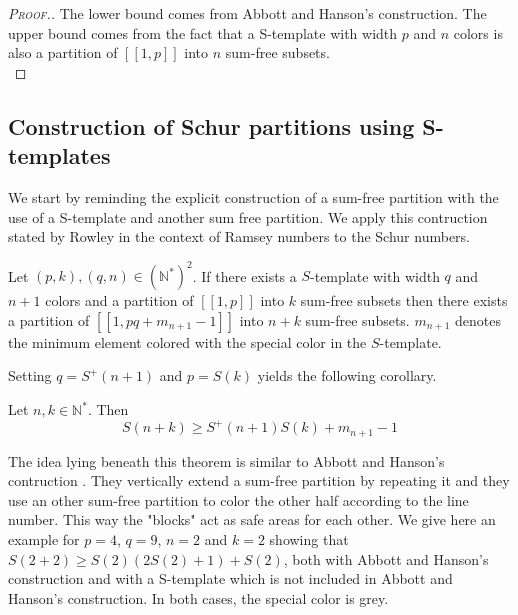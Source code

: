 \begin{proof}[\textsc{Proof.}]
The lower bound comes from Abbott and Hanson's construction. The upper bound comes from the 
fact that a S-template with width \(p\) and \(n\) colors is also a partition of \([\![1, p]\!]\) into \(n\) sum-free subsets. \\
\end{proof}


\subsection{Construction of Schur partitions using S-templates}

\qquad We start by reminding the explicit construction of a sum-free partition with the use of a S-template and another sum free partition. We apply this contruction stated by Rowley in the context of Ramsey numbers to the Schur numbers.

\begin{theorem}
\label{thm:Stemp}
	Let \((p,k), (q,n) \in (\mathbb{N}^*)^2\). If there exists a \(S\)-template with width \(q\) and \(n+1\) colors 
	and a partition of \([\![1,p]\!]\) into \(k\) sum-free subsets then there exists a partition of \([\![1,pq+m_{n+1}
	-1]\!]\) into \(n+k\) sum-free subsets. \(m_{n+1}\) denotes the minimum element colored with the special color in the \(S\)-template.
\end{theorem}

Setting \(q = S^+(n+1)\) and \(p = S(k)\) yields the following corollary.

\begin{corollary}
\label{cor:ineqS}
	Let \(n, k \in \mathbb{N}^*\). Then
	\[ S(n+k) \geqslant S^+(n+1)S(k) + m_{n+1} - 1 \]
\end{corollary}

The idea lying beneath this theorem is similar to Abbott and Hanson's contruction \cite{AbbottHanson}. They vertically 
extend a sum-free partition by repeating it and they use an other sum-free partition to color the other half according 
to the line number. This way the "blocks" act as safe areas for each other. We give here an example for \(p = 4\), 
\(q = 9\), \(n = 2\) and \(k = 2\) showing that \(S(2 + 2) \geqslant S(2) (2 S(2) + 1) + S(2)\), both with Abbott and 
Hanson's construction and with a S-template which is not included in Abbott and Hanson's construction. In both cases, 
the special color is grey.

